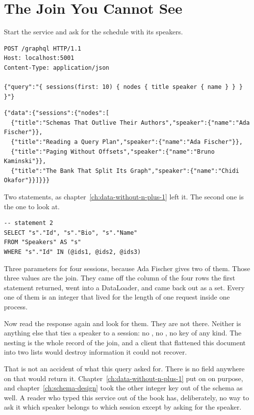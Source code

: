 \section{The Join You Cannot See}
\label{sec:ch05-the-join-you-cannot-see}

%
Start the service and ask for the schedule with its speakers.

\begin{verbatim}
POST /graphql HTTP/1.1
Host: localhost:5001
Content-Type: application/json

{"query":"{ sessions(first: 10) { nodes { title speaker { name } } } }"}
\end{verbatim}

\begin{verbatim}
{"data":{"sessions":{"nodes":[
  {"title":"Schemas That Outlive Their Authors","speaker":{"name":"Ada Fischer"}},
  {"title":"Reading a Query Plan","speaker":{"name":"Ada Fischer"}},
  {"title":"Paging Without Offsets","speaker":{"name":"Bruno Kaminski"}},
  {"title":"The Bank That Split Its Graph","speaker":{"name":"Chidi Okafor"}}]}}}
\end{verbatim}

%
Two statements, as chapter~\ref{ch:data-without-n-plus-1} left it. The second
one is the one to look at.

\begin{verbatim}
-- statement 2
SELECT "s"."Id", "s"."Bio", "s"."Name"
FROM "Speakers" AS "s"
WHERE "s"."Id" IN (@ids1, @ids2, @ids3)
\end{verbatim}

%
Three parameters for four sessions, because Ada Fischer gives two of them.
Those three values are the join. They came off the  column of
the four rows the first statement returned, went into a DataLoader, and came
back out as a set. Every one of them is an integer that lived for the length of
one request inside one process.

%
Now read the response again and look for them. They are not there. Neither is
anything else that ties a speaker to a session: no , no
, no key of any kind. The nesting is the whole record of the
join, and a client that flattened this document into two lists would destroy
information it could not recover.

%
That is not an accident of what this query asked for. There is no field
anywhere on  that would return it.
Chapter~\ref{ch:data-without-n-plus-1} put \code{[GraphQLIgnore]} on
 on purpose, and chapter~\ref{ch:schema-design} took
the other integer key out of the schema as well. A reader who typed this
service out of the book has, deliberately, no way to ask it which speaker
belongs to which session except by asking for the speaker.

